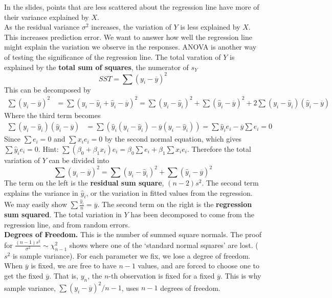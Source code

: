 \documentclass[12pt, a4paper]{article}
\theoremstyle{definition}
\newcommand{\ol}{\overline}
\newcommand{\f}{\frac}
\begin{document}
		In the slides, points that are less scattered about the regression line have more of their variance explained by $X$.\\
		
		As the residual variance $\sigma^2$ increases, the variation of $Y$ is less explained by $X$. This increases prediction error. We want to answer how well the regression line might explain the variation we observe in the responses. ANOVA is another way of testing the significance of the regression line. The total varation of $Y$ is explained by the {\bf total sum of squares}, the numerator of $s_Y$
		$$
			SST = \sum (y_i - \ol y)^2
		$$
		This can be decomposed by 
		\begin{align*}
			\sum (y_i - \ol y)^2 &= \sum (y_i - \hat y_i + \hat y_i - \ol y)^2 = \sum (y_i - \hat y_i)^2 + \sum (\hat y_i - \ol y)^2 + 2 \sum (y_i - \hat y_i)(\hat y_i - \ol y)
		\end{align*}
		Where the third term becomes 
		\begin{align*}
			\sum (y_i - \hat y_i)(\hat y_i - \ol y) &= \sum (\hat y_i (y_i - \hat y_i) - \ol y(y_i - \hat y_i)) = \sum \hat y_i e_i - \ol y \sum e_i = 0
		\end{align*}
		Since $\sum e_i = 0$ and $\sum x_i e_i = 0$ by the second normal equation, which gives $\sum \hat y_i e_i = 0$. Hint: $\sum (\beta_0 + \beta_1 x_i)e_i = \beta_0 \sum e_i + \beta_1 \sum x_i e_i$.
		Therefore the total variation of $Y$ can be divided into 
		$$
			\sum (y_i - \ol y)^2  = \sum (y_i - \hat y_i)^2 + \sum (\hat y_i - \ol y)^2
		$$
		The term on the left is the {\bf residual sum square}, $(n-2)s^2$. The second term explains the variance in $\hat y_i$, or the variation in fitted values from the regression. We may easily show $\sum \f{\hat y_i}{n} = \ol y$. The second term on the right is the {\bf regression sum squared}. The total variation in $Y$ has been decomposed to come from the regression line, and from random errors.\\
		
		{\bf Degrees of Freedom.} This is the number of summed square normals. The proof for $\f{(n-1)s^2}{\sigma^2} \sim \chi_{n-1}^2$ shows where one of the `standard normal squares' are lost. ($s^2$ is sample variance). For each parameter we fix, we lose a degree of freedom. When $\ol y$ is fixed, we are free to have $n-1$ values, and are forced to choose one to get the fixed $\ol y$. That is, $y_n$, the $n$-th observation is fixed for a fixed $\ol y$. This is why sample variance, $\sum (y_i - \ol y)^2 / n-1$, uses $n-1$ degrees of freedom.\\
		
\end{document}
